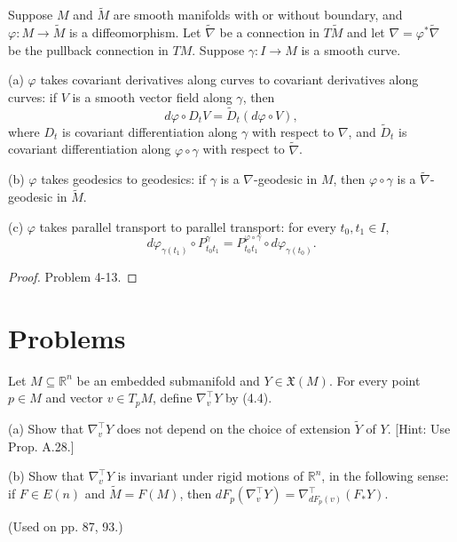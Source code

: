 \begin{proposition}
\label{prop:pullback-connection-properties}
Suppose $M$ and $\tilde{M}$ are smooth manifolds with or without boundary, and $\varphi: M \to \tilde{M}$ is a diffeomorphism. Let $\tilde{\nabla}$ be a connection in $T\tilde{M}$ and let $\nabla = \varphi^*\tilde{\nabla}$ be the pullback connection in $TM$. Suppose $\gamma: I \to M$ is a smooth curve.

(a) $\varphi$ takes covariant derivatives along curves to covariant derivatives along curves: if $V$ is a smooth vector field along $\gamma$, then
\[d\varphi \circ D_t V = \tilde{D}_t(d\varphi \circ V),\]
where $D_t$ is covariant differentiation along $\gamma$ with respect to $\nabla$, and $\tilde{D}_t$ is covariant differentiation along $\varphi \circ \gamma$ with respect to $\tilde{\nabla}$.

(b) $\varphi$ takes geodesics to geodesics: if $\gamma$ is a $\nabla$-geodesic in $M$, then $\varphi \circ \gamma$ is a $\tilde{\nabla}$-geodesic in $\tilde{M}$.

(c) $\varphi$ takes parallel transport to parallel transport: for every $t_0, t_1 \in I$,
\[d\varphi_{\gamma(t_1)} \circ P^\gamma_{t_0t_1} = P^{\varphi \circ \gamma}_{t_0t_1} \circ d\varphi_{\gamma(t_0)}.\]
\end{proposition}

\begin{proof}
Problem 4-13.
\end{proof}

\section{Problems}

\begin{exercise}
\label{prob:embedded-submanifold-covariant-derivative}
Let $M \subseteq \mathbb{R}^n$ be an embedded submanifold and $Y \in \mathfrak{X}(M)$. For every point $p \in M$ and vector $v \in T_p M$, define $\nabla_v^\top Y$ by (4.4).

(a) Show that $\nabla_v^\top Y$ does not depend on the choice of extension $\tilde{Y}$ of $Y$. [Hint: Use Prop. A.28.]

(b) Show that $\nabla_v^\top Y$ is invariant under rigid motions of $\mathbb{R}^n$, in the following sense: if $F \in E(n)$ and $\tilde{M} = F(M)$, then $dF_p(\nabla_v^\top Y) = \nabla_{dF_p(v)}^\top (F_* Y)$.

(Used on pp. 87, 93.)
\end{exercise}

